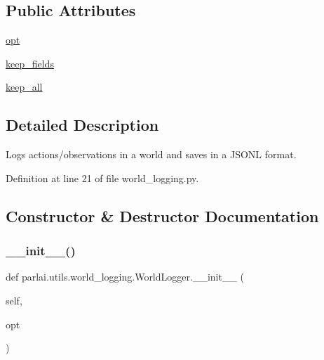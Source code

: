 \subsection*{Public Attributes}
\begin{DoxyCompactItemize}
\item 
\hyperlink{classparlai_1_1utils_1_1world__logging_1_1WorldLogger_aaf2ae02c76953a68916b5136c1d2cc31}{opt}
\item 
\hyperlink{classparlai_1_1utils_1_1world__logging_1_1WorldLogger_afbcb1888545753a6bc9e272ab63e8218}{keep\+\_\+fields}
\item 
\hyperlink{classparlai_1_1utils_1_1world__logging_1_1WorldLogger_aa183aa6d24db81a89a4b21f54d374ef2}{keep\+\_\+all}
\end{DoxyCompactItemize}


\subsection{Detailed Description}
\begin{DoxyVerb}Logs actions/observations in a world and saves in a JSONL format.
\end{DoxyVerb}
 

Definition at line 21 of file world\+\_\+logging.\+py.



\subsection{Constructor \& Destructor Documentation}
\mbox{\label{classparlai_1_1utils_1_1world__logging_1_1WorldLogger_aecf78591417c85526b5f3efb75bbdca1}} 
\subsubsection{\texorpdfstring{\+\_\+\+\_\+init\+\_\+\+\_\+()}{\_\_init\_\_()}}
{\footnotesize\ttfamily def parlai.\+utils.\+world\+\_\+logging.\+World\+Logger.\+\_\+\+\_\+init\+\_\+\+\_\+ (\begin{DoxyParamCaption}\item[{}]{self,  }\item[{}]{opt }\end{DoxyParamCaption})}



